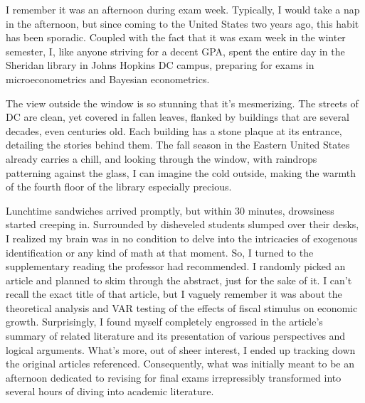 





I remember it was an afternoon during exam week. Typically, I would take a nap in the afternoon, but since coming to the United States two years ago, this habit has been sporadic. Coupled with the fact that it was exam week in the winter semester, I, like anyone striving for a decent GPA, spent the entire day in the Sheridan library in Johns Hopkins DC campus, preparing for exams in microeconometrics and Bayesian econometrics.

The view outside the window is so stunning that it's mesmerizing. The streets of DC are clean, yet covered in fallen leaves, flanked by buildings that are several decades, even centuries old. Each building has a stone plaque at its entrance, detailing the stories behind them. The fall season in the Eastern United States already carries a chill, and looking through the window, with raindrops patterning against the glass, I can imagine the cold outside, making the warmth of the fourth floor of the library especially precious.

Lunchtime sandwiches arrived promptly, but within 30 minutes, drowsiness started creeping in. Surrounded by disheveled students slumped over their desks, I realized my brain was in no condition to delve into the intricacies of exogenous identification or any kind of math at that moment. So, I turned to the supplementary reading the professor had recommended. I randomly picked an article and planned to skim through the abstract, just for the sake of it. I can't recall the exact title of that article, but I vaguely remember it was about the theoretical analysis and VAR testing of the effects of fiscal stimulus on economic growth. Surprisingly, I found myself completely engrossed in the article's summary of related literature and its presentation of various perspectives and logical arguments. What's more, out of sheer interest, I ended up tracking down the original articles referenced. Consequently, what was initially meant to be an afternoon dedicated to revising for final exams irrepressibly transformed into several hours of diving into academic literature.

